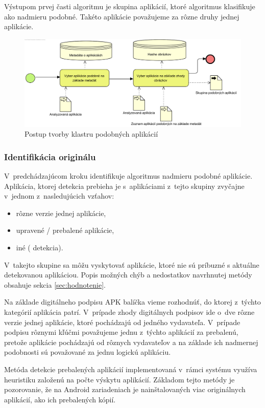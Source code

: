 Výstupom prvej časti algoritmu je skupina aplikácií, ktoré algoritmus klasifikuje ako nadmieru podobné. Takéto aplikácie považujeme za rôzne druhy jednej aplikácie.

\begin{figure}[htb]
  \begin{center}
    \includegraphics[width=130mm]{images/detection-cluster.png}
  \end{center}
  \caption{Postup tvorby klastru podobných aplikácií}
  \label{fig:detectionClustering}
\end{figure}
\subsubsection{\textbf{Identifikácia originálu}} 
V~predchádzajúcom kroku identifikuje algoritmus nadmieru podobné aplikácie. Aplikácia, ktorej detekcia prebieha je s~aplikáciami z~tejto skupiny zvyčajne v~jednom z~nasledujúcich vzťahov:
\begin{itemize}
	\item rôzne verzie jednej aplikácie,
	\item upravené / prebalené aplikácie,
	\item iné ( detekcia).
\end{itemize}
V~takejto skupine sa môžu vyskytovať aplikácie, ktoré nie sú príbuzné s aktuálne detekovanou aplikáciou. Popis možných chýb a nedostatkov navrhnutej metódy obsahuje sekcia \ref{sec:hodnotenie}.

Na základe digitálneho podpisu APK balíčka vieme rozhodnúť, do ktorej z~týchto kategórií aplikácia patrí. V~prípade zhody digitálnych podpisov ide o~dve rôzne verzie jednej aplikácie, ktoré pochádzajú od jedného vydavateľa. V~prípade podpisu rôznymi kľúčmi považujeme jednu z~týchto aplikácií za prebalenú, pretože aplikácie pochádzajú od rôznych vydavateľov a na základe ich nadmernej podobnosti sú považované za jednu logickú aplikáciu.

Metóda detekcie prebalených aplikácií implementovaná v~rámci systému  využíva heuristiku založenú na počte výskytu aplikácií. Základom tejto metódy je pozorovanie, že na Android zariadeniach je nainštalovaných viac originálnych aplikácií, ako ich prebalených kópií.

